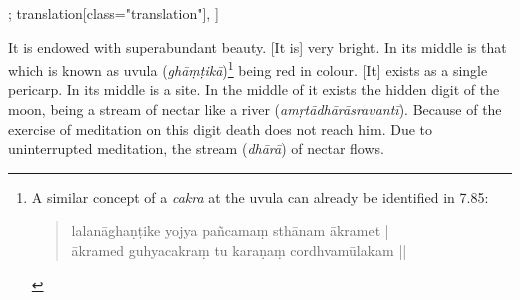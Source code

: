 \begin{alignment}[
    texts=edition[class="edition"];
    translation[class="translation"],
 ]
\begin{translation}
\begin{tlate}
It is endowed with superabundant beauty. [It is] very bright. In its middle is that which is known as uvula (\textit{ghāṃṭikā})\footnote{A similar concept of a \textit{cakra} at the uvula can already be identified in \textcite{kubji1988} 7.85: \begin{quote}
    lalanāghaṇṭike yojya pañcamaṃ sthānam ākramet |\\
    ākramed guhyacakraṃ tu karaṇaṃ cordhvamūlakam ||
  \end{quote}} being red in colour. [It] exists as a single pericarp. In its middle is a site. In the middle of it exists the hidden digit of the moon, being a stream of nectar like a river (\textit{amṛtādhārāsravantī}). Because of the exercise of meditation on this digit death does not reach him. Due to uninterrupted meditation, the stream (\textit{dhārā}) of nectar flows. \vspace*{\fill} 
    \end{tlate}
  \end{translation}
  \ekdpb*{}
\end{alignment}
